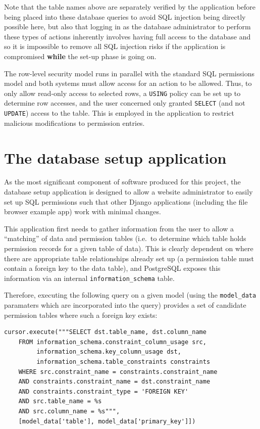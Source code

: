 \documentclass{report}
\begin{document}
Note that the table names above are separately verified by the application before being placed into these database queries to avoid SQL injection being directly possible here, but also that logging in as the database administrator to perform these types of actions inherently involves having full access to the database and so it is impossible to remove all SQL injection risks if the application is compromised \textbf{while} the set-up phase is going on.

The row-level security model runs in parallel with the standard SQL permissions model and both systems must allow access for an action to be allowed. Thus, to only allow read-only access to selected rows, a \texttt{USING} policy can be set up to determine row accesses, and the user concerned only granted \texttt{SELECT} (and not \texttt{UPDATE}) access to the table. This is employed in the application to restrict malicious modifications to permission entries.

\section{The database setup application}
As the most significant component of software produced for this project, the database setup application is designed to allow a website administrator to easily set up SQL permissions such that other Django applications (including the file browser example app) work with minimal changes.

This application first needs to gather information from the user to allow a ``matching'' of data and permission tables (i.e.\ to determine which table holds permission records for a given table of data). This is clearly dependent on where there are appropriate table relationships already set up (a permission table must contain a foreign key to the data table), and PostgreSQL exposes this information via an internal \verb+information_schema+ table.

Therefore, executing the following query on a given model (using the \verb+model_data+ paramaters which are incorporated into the query) provides a set of candidate permission tables where such a foreign key exists:

\begin{verbatim}
cursor.execute("""SELECT dst.table_name, dst.column_name
    FROM information_schema.constraint_column_usage src,
         information_schema.key_column_usage dst,
         information_schema.table_constraints constraints
    WHERE src.constraint_name = constraints.constraint_name
    AND constraints.constraint_name = dst.constraint_name
    AND constraints.constraint_type = 'FOREIGN KEY'
    AND src.table_name = %s
    AND src.column_name = %s""",
    [model_data['table'], model_data['primary_key']])
\end{verbatim}
\end{document}
